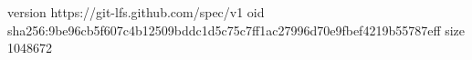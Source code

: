 version https://git-lfs.github.com/spec/v1
oid sha256:9be96cb5f607c4b12509bddc1d5c75c7ff1ac27996d70e9fbef4219b55787eff
size 1048672
